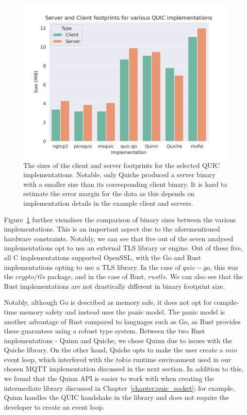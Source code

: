 \begin{figure}[ht]
    \centering
    \includegraphics[width=1\linewidth]{images/quic_impls.png}
    \caption{The sizes of the client and server footprints for the selected QUIC implementations. Notable, only Quiche produced a server binary with a smaller size than its corresponding client binary. It is hard to estimate the error margin for the data as this depends on implementation details in the example client and servers.}
    \label{fig:quic_impls}
\end{figure}

Figure~\ref{fig:quic_impls} further visualises the comparison of binary sizes between the various implementations.
This is an important aspect due to the aforementioned hardware constraints.
Notably, we can see that five out of the seven analysed implementations opt to use an external TLS library or engine.
Out of these five, all C implementations supported OpenSSL, with the Go and Rust implementations opting to use a TLS library.
In the case of $quic-go$, this was the $crypto/tls$ package, and in the case of Rust, $rustls$.
We can also see that the Rust implementations are not drastically different in binary footprint size.

Notably, although Go is described as memory safe, it does not opt for compile-time memory safety and instead uses the panic model.
The panic model is another advantage of Rust compared to languages such as Go, as Rust provides these guarantees using a robust type system.
Between the two Rust implementations - Quinn and Quiche, we chose Quinn due to issues with the Quiche library.
On the other hand, Quiche opts to make the user create a $mio$ event loop, which interfered with the $tokio$ runtime environment used in our chosen MQTT implementation discussed in the next section.
In addition to this, we found that the Quinn API is easier to work with when creating the intermediate library discussed in Chapter~\ref{chapter:quic_socket}; for example, Quinn handles the QUIC handshake in the library and does not require the developer to create an event loop.
